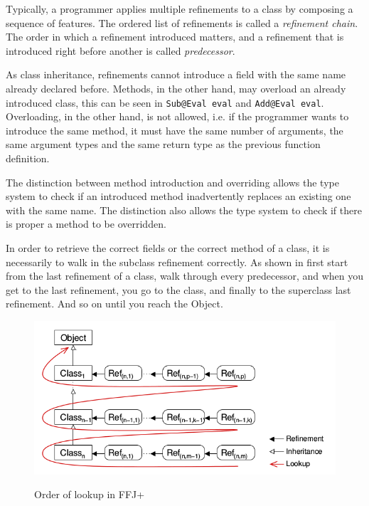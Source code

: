Typically, a programmer applies multiple refinements to a class by composing
a sequence of features. The ordered list of refinements is called a \emph{refinement
chain}. The order in which a refinement introduced matters, and a refinement
that is introduced right before another is called \emph{predecessor}. 

As class inheritance, refinements cannot introduce a field with the same
name already declared before. Methods, in the other hand, may overload an already
introduced class, this can be seen in \texttt{Sub@Eval eval} and \texttt{Add@Eval eval}.
Overloading, in the other hand, is not allowed, i.e. if the programmer wants to introduce the
same method, it must have the same number of arguments, the same argument types
and the same return type as the previous function definition.

The distinction between method introduction and overriding allows the type system to check
if an introduced method inadvertently replaces an existing one with the same name.
The distinction also allows the type system to check if there is proper a method to be overridden.

In order to retrieve the correct fields or the correct method of a class, it is
necessarily to walk in the subclass refinement correctly. As shown in 
first start from the last refinement of a class, walk through every predecessor,
and when you get to the last refinement, you go to the class, and finally to the
superclass last refinement. And so on until you reach the Object.

\begin{figure}[htb]
    \centering
    \includegraphics[scale=0.7]{doc/images/refinement-order}
    \label{fig:refinement-order}
    \caption{Order of lookup in \gls{FFJ+}}
\end{figure} 

